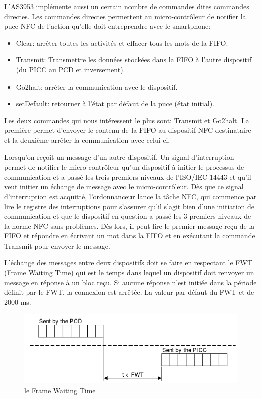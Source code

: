 \documentclass{themeensg}
\begin{document}
L'AS3953 implémente aussi un certain nombre de commandes dites commandes directes. Les commandes directes permettent au micro-contrôleur de notifier la puce NFC de l'action qu'elle doit entreprendre avec le smartphone:

\begin{itemize}
\item Clear: arrêter toutes les activités et effacer tous les mots de la FIFO.
\item Transmit: Transmettre les données stockées dans la FIFO à l'autre dispositif (du PICC au PCD et inversement).
\item Go2halt: arrêter la communication avec le dispositif.
\item setDefault: retourner à l'état par défaut de la puce (état initial).
\end{itemize}

Les deux commandes qui nous intéressent le plus sont: Transmit et Go2halt. La première permet d'envoyer le contenu de la FIFO au dispositif NFC destinataire et la deuxième arrêter la communication avec celui ci.

Lorsqu'on reçoit un message d'un autre dispositif. Un signal d'interruption permet de notifier le micro-contrôleur qu'un dispositif à initier le processus de communication et a passé les trois premiers niveaux de l'ISO/IEC 14443 et qu'il veut initier un échange de message avec le micro-contrôleur. Dès que ce signal d'interruption est acquitté, l'ordonnanceur lance la tâche NFC, qui commence par lire le registre des interruptions pour s'assurer qu'il s'agit bien d'une initiation de communication et que le dispositif en question a passé les 3 premiers niveaux de la norme NFC sans problèmes. Dès lors, il peut lire le premier message reçu de la FIFO et répondre en écrivant un mot dans la FIFO et en exécutant la commande Transmit pour envoyer le message.

L'échange des messages entre deux dispositifs doit se faire en respectant le FWT (Frame Waiting Time) qui est le temps dans lequel un dispositif doit renvoyer un message en réponse à un bloc reçu. Si aucune réponse n'est initiée dans la période définit par le FWT, la connexion est arrêtée. La valeur par défaut du FWT et de 2000 ms.

\begin{figure}[h!]
\centering
\includegraphics[scale=0.65]{images/fwt.png}
\caption{le Frame Waiting Time}
\end{figure}
\end{document}
